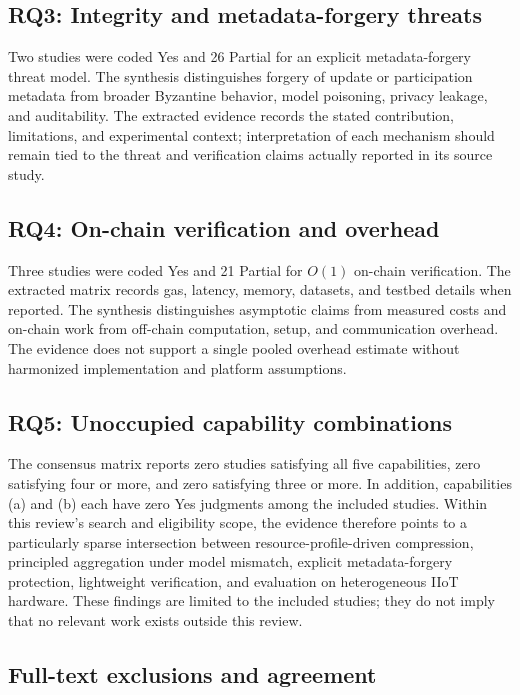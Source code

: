 \documentclass[journal]{IEEEtran}
\begin{document}
\subsection{RQ3: Integrity and metadata-forgery threats}
\label{subsec:rq3}

Two studies were coded Yes and 26 Partial for an explicit metadata-forgery threat model. The synthesis distinguishes forgery of update or participation metadata from broader Byzantine behavior, model poisoning, privacy leakage, and auditability. The extracted evidence records the stated contribution, limitations, and experimental context; interpretation of each mechanism should remain tied to the threat and verification claims actually reported in its source study.

\subsection{RQ4: On-chain verification and overhead}
\label{subsec:rq4}

Three studies were coded Yes and 21 Partial for $O(1)$ on-chain verification. The extracted matrix records gas, latency, memory, datasets, and testbed details when reported. The synthesis distinguishes asymptotic claims from measured costs and on-chain work from off-chain computation, setup, and communication overhead. The evidence does not support a single pooled overhead estimate without harmonized implementation and platform assumptions.

\subsection{RQ5: Unoccupied capability combinations}
\label{subsec:rq5}

The consensus matrix reports zero studies satisfying all five capabilities, zero satisfying four or more, and zero satisfying three or more. In addition, capabilities (a) and (b) each have zero Yes judgments among the included studies. Within this review's search and eligibility scope, the evidence therefore points to a particularly sparse intersection between resource-profile-driven compression, principled aggregation under model mismatch, explicit metadata-forgery protection, lightweight verification, and evaluation on heterogeneous IIoT hardware. These findings are limited to the included studies; they do not imply that no relevant work exists outside this review.

\subsection{Full-text exclusions and agreement}
\label{subsec:agreement}
\end{document}
